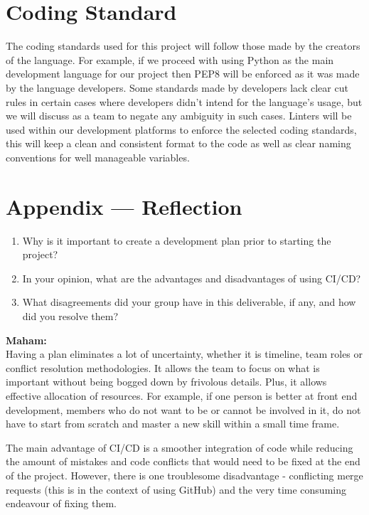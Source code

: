 \documentclass{article}
\begin{document}
\pagebreak

\section{Coding Standard}

The coding standards used for this project will follow those made by the creators of the language. For example, if we proceed with using Python as the main development language for our project then PEP8 will be enforced as it was made by the language developers. Some standards made by developers lack clear cut rules in certain cases where developers didn’t intend for the language’s usage, but we will discuss as a team to negate any ambiguity in such cases.
Linters will be used within our development platforms to enforce the selected coding standards, this will keep a clean and consistent format to the code as well as clear naming conventions for well manageable variables.

\newpage{}

\section*{Appendix --- Reflection}

\begin{enumerate}
    \item Why is it important to create a development plan prior to starting the
    project?
    \item In your opinion, what are the advantages and disadvantages of using
    CI/CD?
    \item What disagreements did your group have in this deliverable, if any,
    and how did you resolve them?
\end{enumerate}
\textbf{Maham:} \\
Having a plan eliminates a lot of uncertainty, whether it is timeline, team roles or conflict resolution methodologies. It allows the team to focus on what is important without being bogged down by frivolous details. Plus, it allows effective allocation of resources. For example, if one person is better at front end development, members who do not want to be or cannot be involved in it, do not have to start from scratch and master a new skill within a small time frame. 

The main advantage of CI/CD is a smoother integration of code while reducing the amount of mistakes and code conflicts that would need to be fixed at the end of the project. However, there is one troublesome disadvantage - conflicting merge requests (this is in the context of using GitHub) and the very time consuming endeavour of fixing them. 
\end{document}
